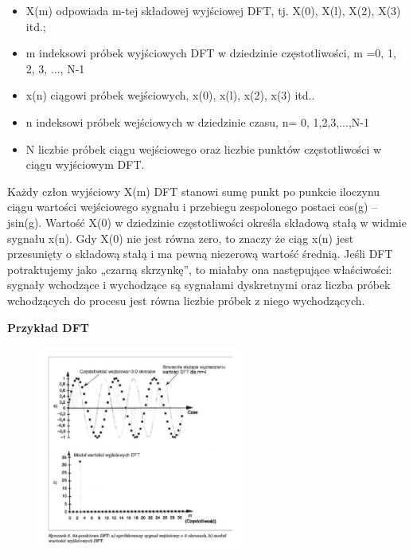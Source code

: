 \documentclass[a4paper,titleauthor]{mwart}
\begin{document}
\begin{itemize}
\item X(m)  odpowiada m-tej składowej wyjściowej DFT, tj. X(0), X(l), X(2), X(3) itd.;
\item m  indeksowi próbek wyjściowych DFT w dziedzinie częstotliwości, m =0, 1, 2, 3, ..., N-1 
\item x(n)  ciągowi próbek wejściowych, x(0), x(l), x(2), x(3) itd.. 
\item n  indeksowi próbek wejściowych w dziedzinie czasu, n= 0, 1,2,3,...,N-1 
\item N  liczbie próbek ciągu wejściowego oraz liczbie punktów częstotliwości w ciągu wyjściowym DFT.
\end{itemize}
Każdy człon wyjściowy X(m) DFT stanowi sumę punkt po punkcie iloczynu ciągu wartości wejściowego sygnału i przebiegu zespolonego postaci cos(g) – jsin(g).
\newline\newline
Wartość X(0) w dziedzinie częstotliwości określa składową stałą w widmie sygnału x(n). Gdy X(0) nie jest równa zero, to znaczy że ciąg x(n) jest przesunięty o składową stałą i ma pewną niezerową wartość średnią.
\newline\newline
Jeśli DFT potraktujemy jako „czarną skrzynkę”, to miałaby ona następujące właściwości: sygnały wchodzące i wychodzące są sygnałami dyskretnymi oraz liczba próbek wchodzących do procesu jest równa liczbie próbek z niego wychodzących.
\newline\newline

\textbf{Przykład DFT}
   \begin{figure}[ht]
    	\centering
    	\includegraphics[width=0.6\textwidth]{fourier4}
   \end{figure}
\end{document}
